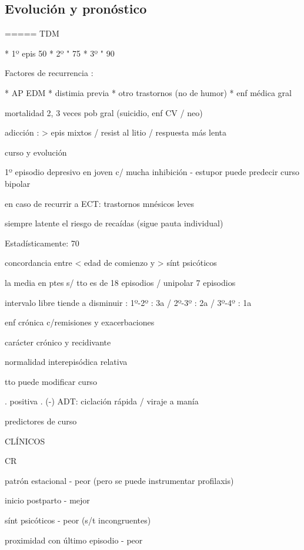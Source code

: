 \documentclass{scrbook}
\begin{document}
\subsection*{Evolución y pronóstico}

===== TDM

* 1º epis 50%
* 2º " 75%
* 3º " 90 %

Factores de recurrencia :

* AP EDM
* distimia previa
* otro trastornos (no de humor)
* enf médica gral

mortalidad 2, 3 veces pob gral (suicidio, enf CV / neo)

adicción : > epis mixtos / resist al litio / respuesta más lenta

curso y evolución

1º episodio depresivo en joven c/ mucha inhibición - estupor puede predecir curso bipolar

en caso de recurrir a ECT: trastornos mnésicos leves

siempre latente el riesgo de recaídas (sigue pauta individual)

Estadísticamente: 70%

concordancia entre < edad de comienzo y > sínt psicóticos

la media en ptes s/ tto es de 18 episodios / unipolar 7 episodios

intervalo libre tiende a disminuir : 1º-2º : 3a / 2º-3º : 2a / 3º-4º : 1a

enf crónica c/remisiones y exacerbaciones

carácter crónico y recidivante

normalidad interepisódica relativa

tto puede modificar curso

. positiva
. (-) ADT: ciclación rápida / viraje a manía

predictores de curso

CLÍNICOS

CR

patrón estacional - peor (pero se puede instrumentar profilaxis)

inicio postparto - mejor

sínt psicóticos - peor (s/t incongruentes)

proximidad con último episodio - peor
\end{document}
